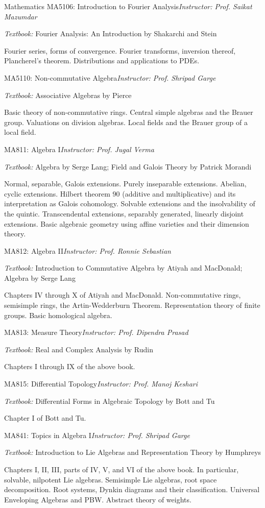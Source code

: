 \begin{rubric}{Mathematics}
    \entry*[AA] MA5106: Introduction to Fourier Analysis\hfill\emph{Instructor: Prof. Saikat Mazumdar}

    \emph{Textbook:} Fourier Analysis: An Introduction by Shakarchi and Stein

    Fourier series, forms of convergence. Fourier transforms, inversion thereof, Plancherel's theorem. Distributions and applications to PDEs.

    \entry*[AA] MA5110: Non-commutative Algebra\hfill\emph{Instructor: Prof. Shripad Garge}

    \emph{Textbook:} Associative Algebras by Pierce 

    Basic theory of non-commutative rings. Central simple algebras and the Brauer group. Valuations on division algebras. Local fields and the Brauer group of a local field.

    \entry*[AA] MA811: Algebra I\hfill\emph{Instructor: Prof. Jugal Verma}

    \emph{Textbook:} Algebra by Serge Lang; Field and Galois Theory by Patrick Morandi

    Normal, separable, Galois extensions. Purely inseparable extensions. Abelian, cyclic extensions. Hilbert theorem $90$ (additive and multiplicative) and its interpretation as Galois cohomology. Solvable extensions and the insolvability of the quintic. Transcendental extensions, separably generated, linearly disjoint extensions. Basic algebraic geometry using affine varieties and their dimension theory.

    \entry*[AA] MA812: Algebra II\hfill\emph{Instructor: Prof. Ronnie Sebastian}

    \emph{Textbook:} Introduction to Commutative Algebra by Atiyah and MacDonald; Algebra by Serge Lang

    Chapters IV through X of Atiyah and MacDonald. Non-commutative rings, semisimple rings, the Artin-Wedderburn Theorem. Representation theory of finite groups. Basic homological algebra.

    \entry*[AA] MA813: Measure Theory\hfill\emph{Instructor: Prof. Dipendra Prasad}

    \emph{Textbook:} Real and Complex Analysis by Rudin 

    Chapters I through IX of the above book.

    \entry*[AA] MA815: Differential Topology\hfill\emph{Instructor: Prof. Manoj Keshari}

    \emph{Textbook:} Differential Forms in Algebraic Topology by Bott and Tu

    Chapter I of Bott and Tu. 

    \entry*[AA] MA841: Topics in Algebra I\hfill\emph{Instructor: Prof. Shripad Garge}

    \emph{Textbook:} Introduction to Lie Algebras and Representation Theory by Humphreys

    Chapters I, II, III, parts of IV, V, and VI of the above book. In particular, solvable, nilpotent Lie algebras. Semisimple Lie algebras, root space decomposition. Root systems, Dynkin diagrams and their classification. Universal Enveloping Algebras and PBW. Abstract theory of weights.
\end{rubric}